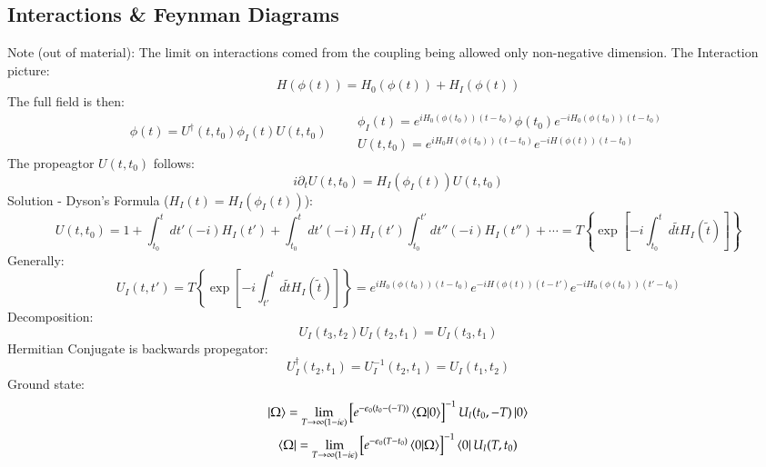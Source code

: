 \documentclass{article}
\begin{document}
\subsection{Interactions \& Feynman Diagrams}
Note (out of material): The limit on interactions comed from the coupling being allowed only non-negative dimension.
\newline
The Interaction picture:
\begin{equation*}
    H(\phi(t)) = H_0(\phi(t)) + H_I(\phi(t))
\end{equation*}
The full field is then:
\begin{equation*}
    \phi(t) = U^\dagger(t,t_0) \phi_I(t) U(t,t_0)
    \qquad
    \begin{matrix}
        \phi_I(t) = e^{iH_0(\phi(t_0))(t - t_0)}\phi(t_0)e^{-iH_0(\phi(t_0))(t - t_0)}
        \\
        U(t,t_0) = e^{iH_0H(\phi(t_0))(t - t_0)}e^{-iH(\phi(t))(t - t_0)}
    \end{matrix}
\end{equation*}
The propeagtor $U(t,t_0)$ follows:
\begin{equation*}
    i\partial_t U(t,t_0) = H_I(\phi_I(t))U(t,t_0)
\end{equation*}
Solution - Dyson's Formula ($H_I(t) = H_I(\phi_I(t))$):
\begin{equation*}
    U(t,t_0) = 1 + \int_{t_0}^t dt'(-i)H_I(t')
     + \int_{t_0}^t dt'(-i)H_I(t') \int_{t_0}^{t'} dt''(-i)H_I(t'') + \cdots = T\left\{\exp[-i\int_{t_0}^t d\tilde{t}H_I(\tilde{t})]\right\}
\end{equation*}
Generally:
\begin{equation*}
    U_I(t,t') = T\left\{\exp[-i\int_{t'}^t d\tilde{t}H_I(\tilde{t})]\right\} =
    e^{iH_0(\phi(t_0))(t - t_0)}
    e^{-iH(\phi(t))(t - t')}
    e^{-iH_0(\phi(t_0))(t' - t_0)}
\end{equation*}
Decomposition:
\begin{equation*}
    U_I(t_3, t_2)U_I(t_2, t_1) = U_I(t_3, t_1)
\end{equation*}
Hermitian Conjugate is backwards propegator:
\begin{equation*}
    U_I^\dagger(t_2, t_1) = U_I^{-1}(t_2, t_1) = U_I(t_1, t_2)
\end{equation*}
Ground state:
\begin{equation*}
\begin{gathered}
    \ket{\Omega} = \lim_{T \rightarrow \infty(1 - i\epsilon)}\left[
        e^{-\epsilon_0(t_0 - (-T))}\braket{\Omega}{0}
    \right]^{-1}
    U_I(t_0, -T)\ket{0}
    \\
    \bra{\Omega} = \lim_{T \rightarrow \infty(1 - i\epsilon)}\left[
        e^{-\epsilon_0(T - t_0)}\braket{0}{\Omega}
    \right]^{-1}
    \bra{0}U_I(T, t_0)
\end{gathered}
\end{equation*}
\end{document}
